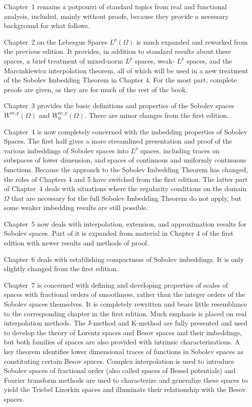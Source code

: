 Chapter~1 remains a potpourri of standard topics from real and functional analysis, included, 
mainly without proofs, because they provide a necessary background for what follows.

Chapter~2 on the Lebesgue Spaces $L^p(\Omega)$ is much expanded and reworked from the previous edition. It provides, in addition to standard results about these spaces, a brief treatment of mixed-norm $L^p$ spaces, weak- $L^p$ spaces, and the Marcinkiewicz interpolation theorem, all of which will be used in a new treatment of the Sobolev Imbedding Theorem in Chapter 4. For the most part, complete proofs are given, as they are for much of the rest of the book.

Chapter~3 provides the basic definitions and properties of the Sobolev spaces $W^{m, p}(\Omega)$ and $W_0^{m, p}(\Omega)$. There are minor changes from the first edition.

Chapter~4 is now completely concerned with the imbedding properties of Sobolev Spaces. The first 
half gives a more streamlined presentation and proof of the various imbeddings of Sobolev spaces 
into $L^p$ spaces, including traces on subspaces of lower dimension, and spaces of continuous and 
uniformly continuous functions. Because the approach to the Sobolev Imbedding Theorem has changed, 
the roles of Chapters 4 and 5 have switched from the first edition. The latter part of Chapter~4 
deals with situations where the regularity conditions on the domain $\Omega$ that are necessary 
for the full Sobolev Imbedding Theorem do not apply, but some weaker imbedding results are still 
possible.

Chapter~5 now deals with interpolation, extension, and approximation results for Sobolev spaces. 
Part of it is expanded from material in Chapter 4 of the first edition with newer results and 
methods of proof.

Chapter~6 deals with establishing compactness of Sobolev imbeddings. It is only slightly changed 
from the first edition.

Chapter~7 is concerned with defining and developing properties of scales of spaces with fractional 
orders of smoothness, rather than the integer orders of the Sobolev spaces themselves. It is 
completely rewritten and bears little resemblance to the corresponding chapter in the first 
edition. Much emphasis is placed on real interpolation methods. The J-method and K-method are 
fully presented and used to develop the theory of Lorentz spaces and Besov spaces and their 
imbeddings, but both families of spaces are also provided with intrinsic characterizations. A
key theorem identifies lower dimensional traces of functions in Sobolev spaces
as constituting certain Besov spaces. Complex interpolation is used to introduce Sobolev spaces of 
fractional order (also called spaces of Bessel potentials) and Fourier transform methods are used 
to characterize and generalize these spaces to yield the Triebel Lizorkin spaces and illuminate 
their relationship with the Besov spaces.

